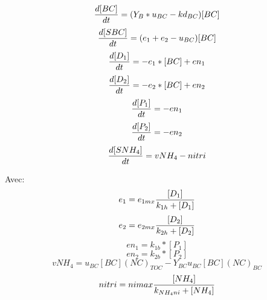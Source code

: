 \begin{equation}
  {{d[BC]}\over{dt}} = (Y_B * u_{BC} - kd_{BC}) [BC]
  \label{eq:eq1}
\end{equation}
\begin{equation}
  {{d[SBC]}\over{dt}} = (e_1 + e_2 - u_{BC}) [BC]
  \label{eq:eq2}
\end{equation}
\begin{equation}
  {{d[D_1]}\over{dt}} = - e_1 * [BC] + en_1
  \label{eq:eq3}
\end{equation}
\begin{equation}
  {{d[D_2]}\over{dt}} = - e_2 * [BC] + en_2
  \label{eq:eq4}
\end{equation}
\begin{equation}
  {{d[P_1]}\over{dt}} = - en_1
  \label{eq:eq5}
\end{equation}
\begin{equation}
  {{d[P_2]}\over{dt}} = - en_2
  \label{eq:eq6}
\end{equation}
\begin{equation}
  {{d[SNH_4]}\over{dt}} =
  vNH_4 - nitri
  \label{eq:eq7}
\end{equation}

\par{Avec:}
\begin{equation}
  e_1 = e_{1mx} {{[D_1]}\over{k_{1h} + [D_1]}}
  \label{eq:eq8}
\end{equation}
\begin{equation}
  e_2 = e_{2mx} {{[D_2]}\over{k_{2h} + [D_2]}}
  \label{eq:eq9}
\end{equation}
\begin{equation}
  en_1 = k_{1b} * [P_1]
  \label{eq:eq10}
\end{equation}
\begin{equation}
  en_2 = k_{2b} * [P_2]
  \label{eq:eq10}
\end{equation}
\begin{equation}
  vNH_4 = u_{BC} [BC] (NC)_{TOC} - Y_{BC} u_{BC} [BC] (NC)_{BC}
  \label{eq:eq6}
\end{equation}
\begin{equation}
  nitri = nimax {{[NH_4]}\over{k_{NH_4ni}+[NH_4]}}
  \label{eq:eq7}
\end{equation}


